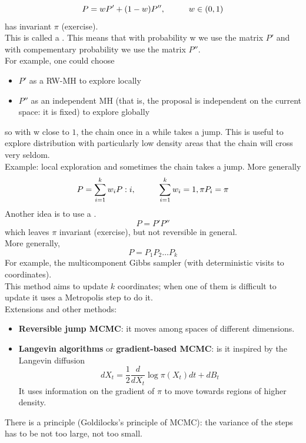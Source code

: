 \documentclass{article}
\begin{document}
\begin{equation*}
    P = w P' + (1-w) P'', \hspace{1 cm} w \in (0,1)
\end{equation*}
has invariant $\pi$ (exercise). \\
This is called a . This means that with probability w we use the matrix $P'$ and with compementary probability we use the matrix $P''$. \\
For example, one could choose
\begin{itemize}
    \item $P'$ as a RW-MH to explore locally
    \item $P''$ as an independent MH (that is, the proposal is independent on the current space: it is fixed) to explore globally 
\end{itemize}
so with w close to $1$, the chain once in a while takes a jump. This is useful to explore distribution with particularly low density areas that the chain will cross very seldom.\\
Example: local exploration and sometimes the chain takes a jump. 
More generally
\begin{equation*}
    P = \sum_{i = 1}^k w_i P:i, \hspace{1 cm} \sum_{i=1}^k w_i=1, \pi P_i = \pi
\end{equation*}
Another idea is to use a . 
\begin{equation*}
    P=P' P''    
\end{equation*}
which leaves $\pi$ invariant (exercise), but not reversible in general.\\
More generally, 
\begin{equation*}
    P=P_1P_2 \ldots P_k
\end{equation*}
For example, the multicomponent Gibbs sampler (with deterministic visits to coordinates).\\

This method aims to update $k$ coordinates; when one of them is difficult to update it uses a Metropolis step to do it. \\

Extensions and other methods:
\begin{itemize}
    \item \textbf{Reversible jump MCMC}: it moves among spaces of different dimensions.  
    \item \textbf{Langevin algorithms} or \textbf{gradient-based MCMC}: is it inspired by the Langevin diffusion
    \begin{equation*}
        dX_t = \frac{1}{2} \frac{d}{dX_t} \log\pi(X_t)dt + dB_t
    \end{equation*}
    It uses information on the gradient of $\pi$ to move towards regions of higher density.
\end{itemize}
There is a principle (Goldilocks's principle of MCMC): the variance of the steps has to be not too large, not too small.
\end{document}
